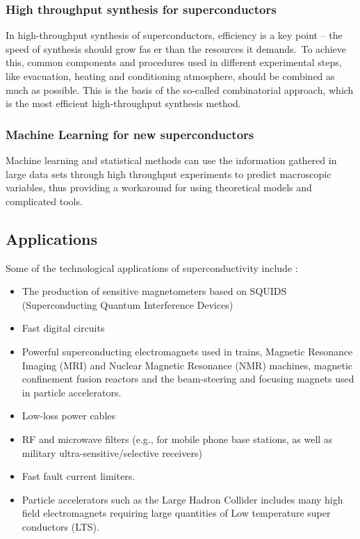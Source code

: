 \documentclass{article}
\begin{document}
\subsubsection{High throughput synthesis for superconductors}
In high-throughput synthesis of superconductors, efficiency is a key point – the speed of synthesis should grow fas er than the resources it demands. To achieve this, common components and procedures used in different experimental steps, like evacuation, heating and conditioning atmosphere, should be combined as much as possible. This is the basis of the so-called combinatorial approach, which is the most efficient high-throughput synthesis method.

\subsubsection{Machine Learning for new superconductors}
Machine learning and statistical methods can use the information gathered in large data sets through high throughput experiments to predict macroscopic variables, thus providing a workaround for using theoretical models and complicated tools.


\subsection{Applications}
Some of the technological applications of superconductivity include \cite{superappwiki}:
\begin{itemize}
    \item The production of sensitive magnetometers based on SQUIDS (Superconducting Quantum Interference Devices)
    \item Fast digital circuits 
    \item Powerful superconducting electromagnets used in trains, Magnetic Resonance Imaging (MRI) and Nuclear Magnetic Resonance (NMR) machines, magnetic confinement fusion reactors and the beam-steering and focusing magnets used in particle accelerators. 
    \item Low-loss power cables 
    \item RF and microwave filters (e.g., for mobile phone base stations, as well as military ultra-sensitive/selective receivers) 
    \item Fast fault current limiters.
    \item Particle accelerators such as the Large Hadron Collider includes many high field electromagnets requiring large quantities of Low temperature super conductors (LTS). 
\end{itemize}









\end{document}
